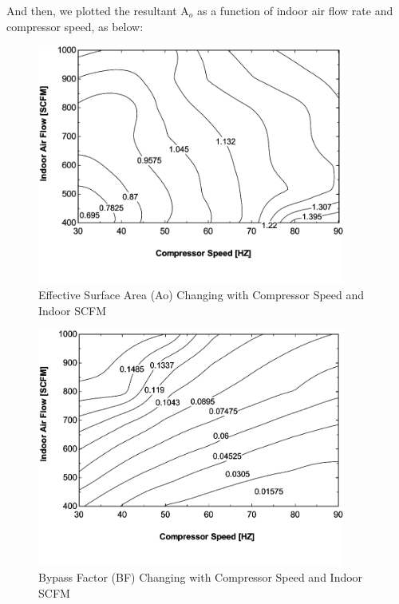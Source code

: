 And then, we plotted the resultant A\(_{o}\) as a function of indoor air flow rate and compressor speed, as below:

\begin{figure}[hbtp] %
\centering
\includegraphics[width=0.9\textwidth, height=0.9\textheight, keepaspectratio=true]{media/image4240.svg.png}
\caption{Effective Surface Area (Ao) Changing with Compressor Speed and Indoor SCFM \protect \label{fig:effective-surface-area-ao-changing-with}}
\end{figure}

\begin{figure}[hbtp] %
\centering
\includegraphics[width=0.9\textwidth, height=0.9\textheight, keepaspectratio=true]{media/image4241.svg.png}
\caption{Bypass Factor (BF) Changing with Compressor Speed and Indoor SCFM \protect \label{fig:bypass-factor-bf-changing-with-compressor}}
\end{figure}

